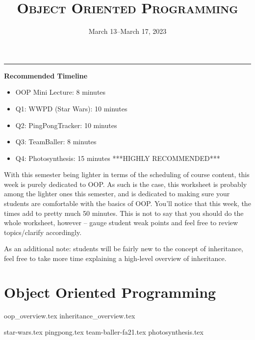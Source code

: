 \documentclass{exam}
\title{\textsc{Object Oriented Programming}}
\date{March 13--March 17, 2023}
\begin{document}
	\maketitle
	\rule{\textwidth}{0.15em}

\begin{meta}
	\textbf{Recommended Timeline}
	\begin{itemize}
		\item OOP Mini Lecture: 8 minutes
		\item Q1: WWPD (Star Wars): 10 minutes
		\item Q2: PingPongTracker: 10 minutes
		\item Q3: TeamBaller: 8 minutes
		\item Q4: Photosynthesis: 15 minutes ***HIGHLY RECOMMENDED*** 
	\end{itemize}
With this semester being lighter in terms of the scheduling of course content, this week is purely dedicated to OOP. As such is the case, this worksheet is probably among the lighter ones this semester, and is dedicated to making sure your students are comfortable with the basics of OOP. You'll notice that this week, the times add to pretty much 50 minutes. This is not to say that you should do the whole worksheet, however -- gauge student weak points and feel free to review topics/clarify accordingly.

As an additional note: students will be fairly new to the concept of inheritance, feel free to take more time explaining a high-level overview of inheritance. 
\end{meta}

\section{Object Oriented Programming}
{oop_overview.tex}
{inheritance_overview.tex}
\newpage
\begin{questions}
{star-wars.tex}
\newpage
{pingpong.tex}
\newpage
{team-baller-fa21.tex}
\newpage
{photosynthesis.tex}
\end{questions}
\end{document}
